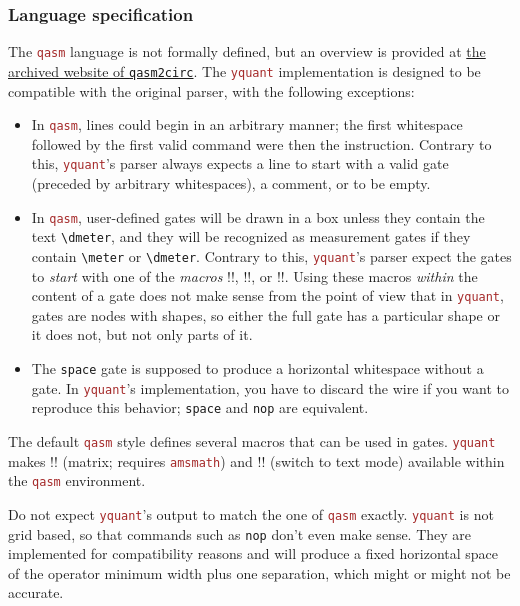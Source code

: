 \documentclass{scrartcl}
\def\pkg#1{\textcolor{brown}{\texttt{#1}}}
\def\Yquant{\pkg{yquant}}
\begin{document}
         \subsubsection{Language specification}
            The \pkg{qasm} language is not formally defined, but an overview is provided at \href{https://web.archive.org/web/20050410022847/https://www.media.mit.edu/quanta/qasm2circ/#spec}{the archived website of \texttt{qasm2circ}}.
            The \Yquant{} implementation is designed to be compatible with the original parser, with the following exceptions:
            \begin{itemize}
               \item In \pkg{qasm}, lines could begin in an arbitrary manner; the first whitespace followed by the first valid command were then the instruction.
                  Contrary to this, \Yquant's parser always expects a line to start with a valid gate (preceded by arbitrary whitespaces), a comment, or to be empty.
               \item In \pkg{qasm}, user\hyp defined gates will be drawn in a box unless they contain the text \texttt{\textbackslash dmeter}, and they will be recognized as measurement gates if they contain \texttt{\textbackslash meter} or \texttt{\textbackslash dmeter}.
                  Contrary to this, \Yquant's parser expect the gates to \emph{start} with one of the \emph{macros} \tex!\meter!, \tex!\dmeter!, or \tex!\dmeterwide!.
                  Using these macros \emph{within} the content of a gate does not make sense from the point of view that in \Yquant, gates are nodes with shapes, so either the full gate has a particular shape or it does not, but not only parts of it.
               \item The \texttt{space} gate is supposed to produce a horizontal whitespace without a gate.
                  In \Yquant's implementation, you have to discard the wire if you want to reproduce this behavior; \texttt{space} and \texttt{nop} are equivalent.
            \end{itemize}

            The default \pkg{qasm} style defines several macros that can be used in gates.
            \Yquant{} makes \tex!\m! (matrix; requires \pkg{amsmath}) and \tex!\txt! (switch to text mode) available within the \pkg{qasm} environment.

            Do not expect \Yquant's output to match the one of \pkg{qasm} exactly.
            \Yquant{} is not grid based, so that commands such as \texttt{nop} don't even make sense.
            They are implemented for compatibility reasons and will produce a fixed horizontal space of the operator minimum width plus one separation, which might or might not be accurate.
\end{document}
